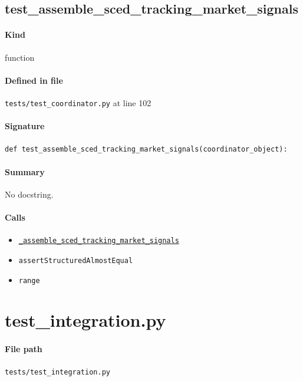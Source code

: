 \documentclass[11pt]{report}
\begin{document}
\subsection{test\_assemble\_sced\_tracking\_market\_signals}
\label{def:tests-test_coordinator.py:test_assemble_sced_tracking_market_signals:L102}
\paragraph{Kind} function
\paragraph{Defined in file} \texttt{tests/test\_coordinator.py} at line 102
\paragraph{Signature} \texttt{def test\_assemble\_sced\_tracking\_market\_signals(coordinator\_object):}
\paragraph{Summary} No docstring.
\paragraph{Calls}
\begin{itemize}[leftmargin=*]
  \item \hyperref[def:coordinator.py:DoubleLoopCoordinator._assemble_sced_tracking_market_signals:L683]{\texttt{\_assemble\_sced\_tracking\_market\_signals}}
  \item \texttt{assertStructuredAlmostEqual}
  \item \texttt{range}
\end{itemize}

\section{test\_integration.py}
\label{file:tests-test_integration.py}
\paragraph{File path} \texttt{tests/test\_integration.py}
\end{document}
